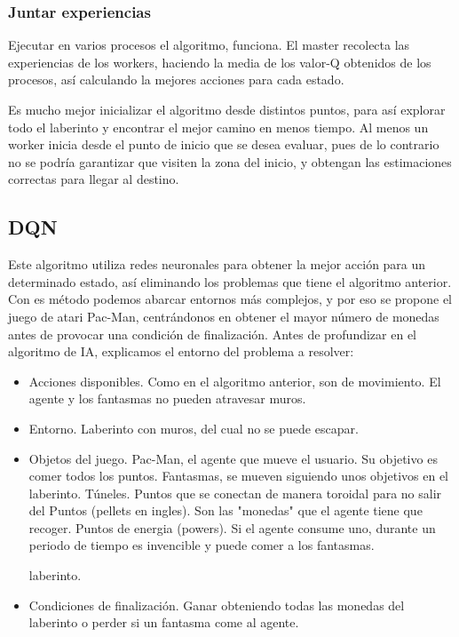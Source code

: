 		\subsubsection{Juntar experiencias}
	
			Ejecutar en varios procesos el algoritmo, funciona. El master recolecta las experiencias de los workers, haciendo la media de los valor-Q obtenidos de los procesos, así calculando la mejores acciones para cada estado. 
			
			Es mucho mejor inicializar el algoritmo desde distintos puntos, para así explorar todo el laberinto y encontrar el mejor camino en menos tiempo. Al menos un worker inicia desde el punto de inicio que se desea evaluar, pues de lo contrario no se podría garantizar que visiten la zona del inicio, y obtengan las estimaciones correctas para llegar al destino.
			
			
	
	
	
	
	\subsection{DQN}
	
		Este algoritmo utiliza redes neuronales para obtener la mejor acción para un determinado estado, así eliminando los problemas que tiene el algoritmo anterior. Con es método podemos abarcar entornos más complejos, y por eso se propone el juego de atari Pac-Man, centrándonos en obtener el mayor número de monedas antes de provocar una condición de finalización. Antes de profundizar en el algoritmo de IA, explicamos el entorno del problema a resolver:
		\vspace{-0.5cm}
		\begin{itemize}		
			\item Acciones disponibles. Como en el algoritmo anterior, son de movimiento. El agente y los fantasmas no pueden atravesar muros.
			\vspace*{-0.2cm}
			\item Entorno. Laberinto con muros, del cual no se puede escapar.
			\item Objetos del juego. 
			\vspace*{-0.3cm}
				\subitem Pac-Man, el agente que mueve el usuario. Su objetivo es comer todos los puntos.
				\vspace*{-0.3cm}
				\subitem Fantasmas, se mueven siguiendo unos objetivos en el laberinto.
				\vspace*{-0.3cm}
				\subitem Túneles. Puntos que se conectan de manera toroidal para no salir del
				\vspace*{-0.3cm}
				\subitem Puntos (pellets en ingles). Son las "monedas" que el agente tiene que recoger.
				\vspace*{-0.3cm}
				\subitem Puntos de energia (powers). Si el agente consume uno, durante un periodo de tiempo es invencible y puede comer a los fantasmas.
				
				 laberinto.				
			\vspace*{-0.3cm}
			\item Condiciones de finalización. Ganar obteniendo todas las monedas del laberinto o perder si un fantasma come al agente. 			
		\end{itemize}
		
